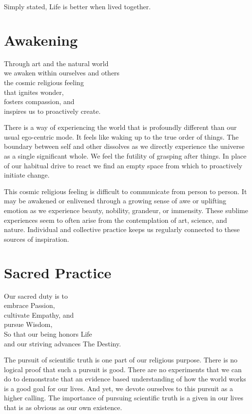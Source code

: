 \documentclass[ebook,12pt,openany,twoside]{memoir}
\newcommand{\tab}{\hspace*{2em}}
\newcommand{\imagefacingchapter}[1]{
  \cleartoverso
  \clearpage \null
  \thispagestyle{cleared}
  \AddToShipoutPictureBG*{%
    \AtStockLowerLeft{%
      \texttt{[image: \#1]}
    }
  }
  \clearpage
}
\begin{document}
Simply stated, Life is better when lived together.




\chapter{Awakening}
\setlength\epigraphwidth{3.0in}
\epigraph{
  Through art and the natural world\\
  we awaken within ourselves and others\\
  \tab the cosmic religious feeling\\
  \tab that ignites wonder,\\
  \tab fosters compassion, and\\
  \tab inspires us to proactively create.
}{}

There is a way of experiencing the world that is profoundly different than our
usual ego-centric mode. It feels like waking up to the true order of things.
The boundary between self and other dissolves as we directly experience the
universe as a single significant whole. We feel the futility of grasping after
things. In place of our habitual drive to react we find an empty space from
which to proactively initiate change.

This cosmic religious feeling is difficult to communicate from person to
person. It may be awakened or enlivened through a growing sense of awe or
uplifting emotion as we experience beauty, nobility, grandeur, or immensity.
These sublime experiences seem to often arise from the contemplation of art,
science, and nature. Individual and collective practice keeps us regularly
connected to these sources of inspiration.





\imagefacingchapter{images/StainedGlass}
\chapter{Sacred Practice}
\setlength\epigraphwidth{3.0in}
\epigraph{
  Our sacred duty is to\\
  embrace Passion,\\
  cultivate Empathy, and\\
  pursue Wisdom,\\
  \tab So that our being honors Life\\
  \tab and our striving advances The Destiny.
}{}

\noindent The pursuit of scientific truth is one part of our religious purpose.
There is no logical proof that such a pursuit is good. There are no experiments
that we can do to demonstrate that an evidence based understanding of how the
world works is a good goal for our lives. And yet, we devote ourselves to this
pursuit as a higher calling. The importance of pursuing scientific truth is a
given in our lives that is as obvious as our own existence.
\end{document}
